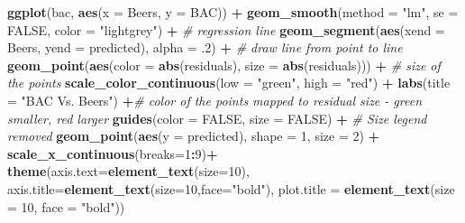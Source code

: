 \documentclass[
]{book}
\newenvironment{Shaded}{\begin{snugshade}}{\end{snugshade}}
\newcommand{\AttributeTok}[1]{\textcolor[rgb]{0.13,0.29,0.53}{#1}}
\newcommand{\CommentTok}[1]{\textcolor[rgb]{0.56,0.35,0.01}{\textit{#1}}}
\newcommand{\ConstantTok}[1]{\textcolor[rgb]{0.56,0.35,0.01}{#1}}
\newcommand{\DecValTok}[1]{\textcolor[rgb]{0.00,0.00,0.81}{#1}}
\newcommand{\FunctionTok}[1]{\textcolor[rgb]{0.13,0.29,0.53}{\textbf{#1}}}
\newcommand{\NormalTok}[1]{#1}
\newcommand{\SpecialCharTok}[1]{\textcolor[rgb]{0.81,0.36,0.00}{\textbf{#1}}}
\newcommand{\StringTok}[1]{\textcolor[rgb]{0.31,0.60,0.02}{#1}}
\begin{document}
\begin{Shaded}
\begin{Highlighting}[]
\FunctionTok{ggplot}\NormalTok{(bac, }\FunctionTok{aes}\NormalTok{(}\AttributeTok{x =}\NormalTok{ Beers, }\AttributeTok{y =}\NormalTok{ BAC)) }\SpecialCharTok{+}
  \FunctionTok{geom\_smooth}\NormalTok{(}\AttributeTok{method =} \StringTok{"lm"}\NormalTok{, }\AttributeTok{se =} \ConstantTok{FALSE}\NormalTok{, }\AttributeTok{color =} \StringTok{"lightgrey"}\NormalTok{) }\SpecialCharTok{+}     \CommentTok{\# regression line  }
  \FunctionTok{geom\_segment}\NormalTok{(}\FunctionTok{aes}\NormalTok{(}\AttributeTok{xend =}\NormalTok{ Beers, }\AttributeTok{yend =}\NormalTok{ predicted), }\AttributeTok{alpha =}\NormalTok{ .}\DecValTok{2}\NormalTok{) }\SpecialCharTok{+}      \CommentTok{\# draw line from point to line}
  \FunctionTok{geom\_point}\NormalTok{(}\FunctionTok{aes}\NormalTok{(}\AttributeTok{color =} \FunctionTok{abs}\NormalTok{(residuals), }\AttributeTok{size =} \FunctionTok{abs}\NormalTok{(residuals))) }\SpecialCharTok{+}  \CommentTok{\# size of the points}
  \FunctionTok{scale\_color\_continuous}\NormalTok{(}\AttributeTok{low =} \StringTok{"green"}\NormalTok{, }\AttributeTok{high =} \StringTok{"red"}\NormalTok{) }\SpecialCharTok{+}   
  \FunctionTok{labs}\NormalTok{(}\AttributeTok{title =} \StringTok{"BAC Vs. Beers"}\NormalTok{) }\SpecialCharTok{+}\CommentTok{\# color of the points mapped to residual size {-} green smaller, red larger}
  \FunctionTok{guides}\NormalTok{(}\AttributeTok{color =} \ConstantTok{FALSE}\NormalTok{, }\AttributeTok{size =} \ConstantTok{FALSE}\NormalTok{) }\SpecialCharTok{+}                             \CommentTok{\# Size legend removed}
  \FunctionTok{geom\_point}\NormalTok{(}\FunctionTok{aes}\NormalTok{(}\AttributeTok{y =}\NormalTok{ predicted), }\AttributeTok{shape =} \DecValTok{1}\NormalTok{, }\AttributeTok{size =} \DecValTok{2}\NormalTok{) }\SpecialCharTok{+}
  \FunctionTok{scale\_x\_continuous}\NormalTok{(}\AttributeTok{breaks=}\DecValTok{1}\SpecialCharTok{:}\DecValTok{9}\NormalTok{)}\SpecialCharTok{+}
  \FunctionTok{theme}\NormalTok{(}\AttributeTok{axis.text=}\FunctionTok{element\_text}\NormalTok{(}\AttributeTok{size=}\DecValTok{10}\NormalTok{),}
        \AttributeTok{axis.title=}\FunctionTok{element\_text}\NormalTok{(}\AttributeTok{size=}\DecValTok{10}\NormalTok{,}\AttributeTok{face=}\StringTok{"bold"}\NormalTok{),}
        \AttributeTok{plot.title =} \FunctionTok{element\_text}\NormalTok{(}\AttributeTok{size =} \DecValTok{10}\NormalTok{, }\AttributeTok{face =} \StringTok{"bold"}\NormalTok{))}
\end{Highlighting}
\end{Shaded}
\end{document}
